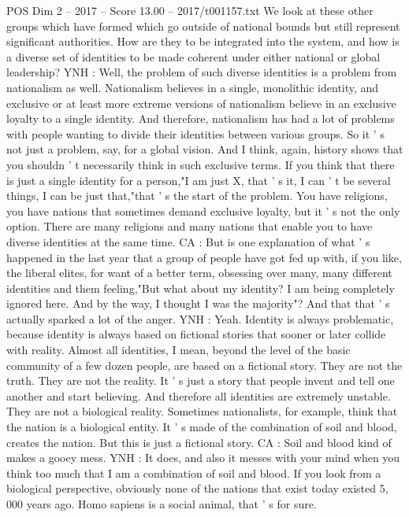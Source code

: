 \begin{textsample}{POS Dim 2 – 2017 – Score 13.00 – 2017/t001157.txt}
We look at these other groups which have formed which go outside of national bounds but still represent significant authorities.
How are they to be integrated into the system, and how is a diverse set of identities to be made coherent under either national or global leadership?
YNH : Well, the problem of such diverse identities is a problem from nationalism as well.
Nationalism believes in a single, monolithic identity, and exclusive or at least more extreme versions of nationalism believe in an exclusive loyalty to a single identity.
And therefore, nationalism has had a lot of problems with people wanting to divide their identities between various groups.
So it ' s not just a problem, say, for a global vision.
And I think, again, history shows that you shouldn ' t necessarily think in such exclusive terms.
If you think that there is just a single identity for a person,"I am just X, that ' s it, I can ' t be several things, I can be just that,"that ' s the start of the problem.
You have religions, you have nations that sometimes demand exclusive loyalty, but it ' s not the only option.
There are many religions and many nations that enable you to have diverse identities at the same time.
CA : But is one explanation of what ' s happened in the last year that a group of people have got fed up with, if you like, the liberal elites, for want of a better term, obsessing over many, many different identities and them feeling,"But what about my identity?
I am being completely ignored here.
And by the way, I thought I was the majority"?
And that that ' s actually sparked a lot of the anger.
YNH : Yeah.
Identity is always problematic, because identity is always based on fictional stories that sooner or later collide with reality.
Almost all identities, I mean, beyond the level of the basic community of a few dozen people, are based on a fictional story.
They are not the truth.
They are not the reality.
It ' s just a story that people invent and tell one another and start believing.
And therefore all identities are extremely unstable.
They are not a biological reality.
Sometimes nationalists, for example, think that the nation is a biological entity.
It ' s made of the combination of soil and blood, creates the nation.
But this is just a fictional story.
CA : Soil and blood kind of makes a gooey mess.
YNH : It does, and also it messes with your mind when you think too much that I am a combination of soil and blood.
If you look from a biological perspective, obviously none of the nations that exist today existed 5, 000 years ago.
Homo sapiens is a social animal, that ' s for sure.

\end{textsample}
